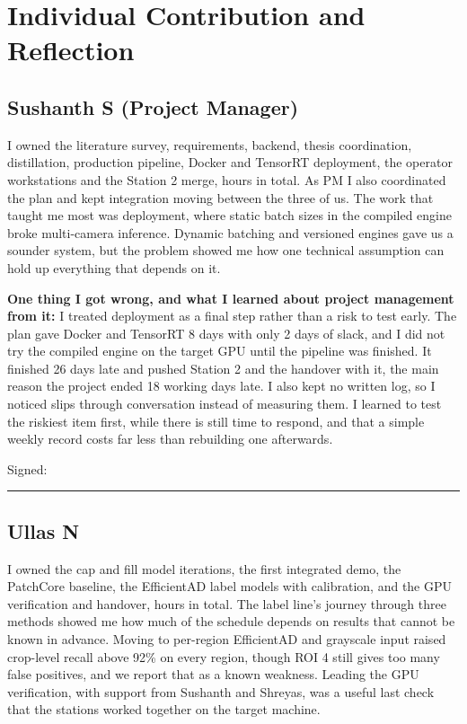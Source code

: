 \section{Individual Contribution and Reflection}


\subsection*{Sushanth S (Project Manager)}
I owned the literature survey, requirements, backend, thesis coordination, distillation, production pipeline, Docker and TensorRT deployment, the operator workstations and the Station 2 merge, \vHoursSu{} hours in total. As PM I also coordinated the plan and kept integration moving between the three of us. The work that taught me most was deployment, where static batch sizes in the compiled engine broke multi-camera inference. Dynamic batching and versioned engines gave us a sounder system, but the problem showed me how one technical assumption can hold up everything that depends on it.

\textbf{One thing I got wrong, and what I learned about project management from it:} I treated deployment as a final step rather than a risk to test early. The plan gave Docker and TensorRT 8 days with only 2 days of slack, and I did not try the compiled engine on the target GPU until the pipeline was finished. It finished 26 days late and pushed Station 2 and the handover with it, the main reason the project ended 18 working days late. I also kept no written log, so I noticed slips through conversation instead of measuring them. I learned to test the riskiest item first, while there is still time to respond, and that a simple weekly record costs far less than rebuilding one afterwards.

Signed: \rule{4cm}{0.4pt}

\subsection*{Ullas N}
I owned the cap and fill model iterations, the first integrated demo, the PatchCore baseline, the EfficientAD label models with calibration, and the GPU verification and handover, \vHoursUl{} hours in total. The label line's journey through three methods showed me how much of the schedule depends on results that cannot be known in advance. Moving to per-region EfficientAD and grayscale input raised crop-level recall above 92\% on every region, though ROI 4 still gives too many false positives, and we report that as a known weakness. Leading the GPU verification, with support from Sushanth and Shreyas, was a useful last check that the stations worked together on the target machine.

